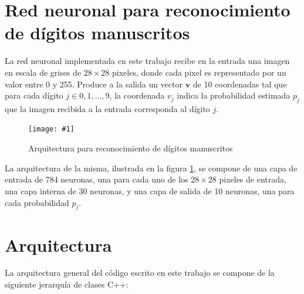\documentclass[a4paper, 10pt, twoside]{article}
\newcommand{\img}[3]{
  \begin{figure}[H]
    \begin{center}
      \texttt{[image: \#1]}
    \end{center}
    \caption{#2}
    \label{#3}
  \end{figure}
}
\begin{document}


\section{Red neuronal para reconocimiento de dígitos manuscritos}

La red neuronal implementada en este trabajo recibe en la entrada una imagen en
escala de grises de $28 \times 28$ pixeles, donde cada pixel es representado
por un valor entre 0 y 255. Produce a la salida un vector $\bm{v}$ de 10
coordenadas tal que para cada dígito $j \in 0, 1, \ldots, 9$, la coordenada
$v_j$ indica la probabilidad estimada $p_j$ que la imagen recibida a la entrada
corresponda al dígito $j$.

\img{handwritten-digit-recognition-neural-network.png}
    {Arquitectura para reconocimiento de dígitos manuscritos}
    {img:handwritten-digit-recognition-neural-network}

La arquitectura de la misma, ilustrada en la figura
\ref{img:handwritten-digit-recognition-neural-network}, se compone de una capa
de entrada de 784 neuronas, una para cada uno de los $28 \times 28$ pixeles de
entrada, una capa interna de 30 neuronas, y una capa de salida de 10 neuronas,
una para cada probabilidad $p_j$.




\section{Arquitectura}

La arquitectura general del código escrito en este trabajo se compone de la
siguiente jerarquía de clases C++:
\end{document}
